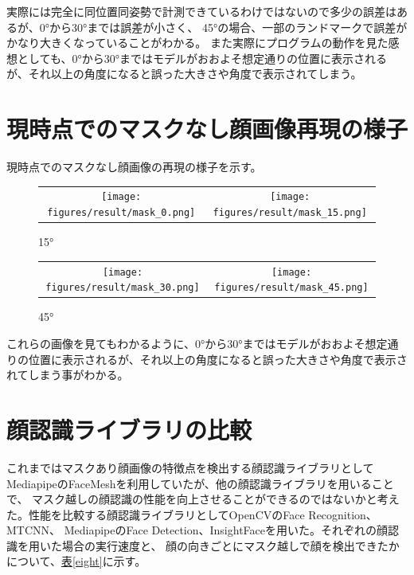 \documentclass[]{jarticle}          %
\begin{document}
実際には完全に同位置同姿勢で計測できているわけではないので多少の誤差はあるが、0°から30°までは誤差が小さく、
45°の場合、一部のランドマークで誤差がかなり大きくなっていることがわかる。
また実際にプログラムの動作を見た感想としても、0°から30°まではモデルがおおよそ想定通りの位置に表示されるが、それ以上の角度になると誤った大きさや角度で表示されてしまう。

\section{現時点でのマスクなし顔画像再現の様子}
現時点でのマスクなし顔画像の再現の様子を示す。
\begin{figure}[!ht]
  \begin{tabular}{cc}
    \begin{minipage}[t]{0.45\hsize}
      \centering
      \texttt{[image: figures/result/mask\_0.png]}
      \caption{0°}
    \end{minipage} &
    \begin{minipage}[t]{0.45\hsize}
      \centering
      \texttt{[image: figures/result/mask\_15.png]}
      \caption{15°}
    \end{minipage}
  \end{tabular}
\end{figure}
\begin{figure}[!ht]
  \begin{tabular}{cc}
    \begin{minipage}[t]{0.45\hsize}
      \centering
      \texttt{[image: figures/result/mask\_30.png]}
      \caption{30°}
    \end{minipage} &
    \begin{minipage}[t]{0.45\hsize}
      \centering
      \texttt{[image: figures/result/mask\_45.png]}
      \caption{45°}
    \end{minipage}
  \end{tabular}
\end{figure}
これらの画像を見てもわかるように、0°から30°まではモデルがおおよそ想定通りの位置に表示されるが、それ以上の角度になると誤った大きさや角度で表示されてしまう事がわかる。

\section{顔認識ライブラリの比較}
これまではマスクあり顔画像の特徴点を検出する顔認識ライブラリとしてMediapipeのFaceMeshを利用していたが、他の顔認識ライブラリを用いることで、
マスク越しの顔認識の性能を向上させることができるのではないかと考えた。性能を比較する顔認識ライブラリとしてOpenCVのFace Recognition、MTCNN、
MediapipeのFace Detection、InsightFaceを用いた。それぞれの顔認識を用いた場合の実行速度と、
顔の向きごとにマスク越しで顔を検出できたかについて、\hyperref[eight]{表\ref{eight}}に示す。
\end{document}
